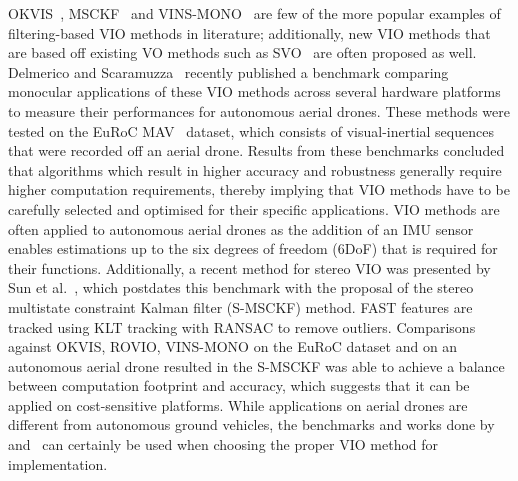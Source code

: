 OKVIS~\cite{leutenegger_keyframe-based_2015}, MSCKF~\cite{mourikis_multi-state_2007} and VINS-MONO~\cite{qin_vins-mono:_2017} are few of the more popular examples of filtering-based VIO methods in literature; additionally, new VIO methods that are based off existing VO methods such as SVO~\cite{faessler_autonomous_2016,forster_-manifold_2017} are often proposed as well. Delmerico and Scaramuzza~\cite{delmerico_benchmark_2018} recently published a benchmark comparing monocular applications of these VIO methods across several hardware platforms to measure their performances for autonomous aerial drones. These methods were tested on the EuRoC MAV~\cite{burri_euroc_2016} dataset, which consists of visual-inertial sequences that were recorded off an aerial drone. Results from these benchmarks concluded that algorithms which result in higher accuracy and robustness generally require higher computation requirements, thereby implying that VIO methods have to be carefully selected and optimised for their specific applications. VIO methods are often applied to autonomous aerial drones as the addition of an IMU sensor enables estimations up to the six degrees of freedom (6DoF) that is required for their functions. Additionally, a recent method for stereo VIO was presented by Sun et al.~\cite{sun_robust_2018}, which postdates this benchmark with the proposal of the stereo multistate constraint Kalman filter (S-MSCKF) method. FAST features are tracked using KLT tracking with RANSAC to remove outliers. Comparisons against OKVIS, ROVIO, VINS-MONO on the EuRoC dataset and on an autonomous aerial drone resulted in the S-MSCKF was able to achieve a balance between computation footprint and accuracy, which suggests that it can be applied on cost-sensitive platforms. While applications on aerial drones are different from autonomous ground vehicles, the benchmarks and works done by~\cite{delmerico_benchmark_2018} and~\cite{sun_robust_2018} can certainly be used when choosing the proper VIO method for implementation.


